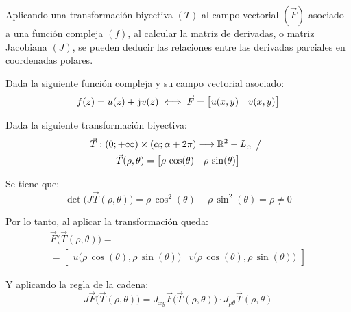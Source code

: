 Aplicando una transformación biyectiva $(T)$ al campo vectorial $(\Vec{F})$ asociado a una función compleja $(f)$, al calcular la matriz de derivadas, o matriz Jacobiana $(J)$, se pueden deducir las relaciones entre las derivadas parciales en coordenadas polares.

Dada la siguiente función compleja y su campo vectorial asociado:
\begin{equation*}
    f(z) = u(z) + \mkern2mu\mathrm{j}\mkern1mu v(z) \iff \Vec{F} = \begin{bmatrix} u(x,y) & v(x,y) \end{bmatrix}
\end{equation*}

Dada la siguiente transformación biyectiva:
\begin{multline*}
    \Vec{T}: (0;+\infty) \times (\alpha;\alpha+2\pi) \longrightarrow \mathbb{R}^2 - L_\alpha \hspace{1ex} \big/ \hspace{1ex}
    \\
    \Vec{T}(\rho,\theta) = \begin{bmatrix} \rho \, \cos(\theta) & \rho \, \sin(\theta) \end{bmatrix}
\end{multline*}

Se tiene que:
\begin{equation*}
    \operatorname{det} \big( J \Vec{T}(\rho,\theta) \big) = \rho \, \cos^2(\theta) + \rho \, \sin^2(\theta) = \rho \neq 0
\end{equation*}

Por lo tanto, al aplicar la transformación queda:
\begin{multline*}
    \Vec{F} \Big( \Vec{T}(\rho,\theta) \Big) =
    \\
    = \begin{bmatrix} u \Big( \rho \, \cos{(\theta)} , \rho \, \sin(\theta) \Big) & v \Big( \rho \, \cos(\theta) , \rho \, \sin(\theta) \Big) \end{bmatrix}
\end{multline*}

Y aplicando la regla de la cadena:
\begin{equation*}
    J \Vec{F} \Big( \Vec{T}(\rho,\theta) \Big) = J_{xy} \Vec{F} \Big( \Vec{T}(\rho,\theta) \Big) \cdot J_{\rho\theta} \Vec{T}(\rho,\theta)
\end{equation*}

